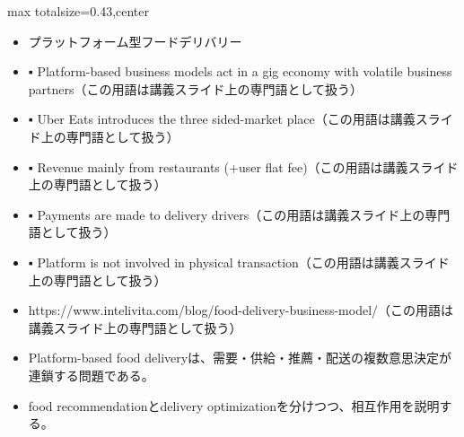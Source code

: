 \clearpage
{}
\begin{minipage}[t]{0.405\textwidth}
\begin{adjustbox}{max totalsize={\textwidth}{0.43\textheight},center}
\begin{minipage}{\textwidth}\scriptsize
{}\begin{itemize}
\item プラットフォーム型フードデリバリー
\item ▪ Platform-based business models act in a gig economy with volatile business partners（この用語は講義スライド上の専門語として扱う）
\item ▪ Uber Eats introduces the three sided-market place（この用語は講義スライド上の専門語として扱う）
\item ▪ Revenue mainly from restaurants (+user flat fee)（この用語は講義スライド上の専門語として扱う）
\item ▪ Payments are made to delivery drivers（この用語は講義スライド上の専門語として扱う）
\item ▪ Platform is not involved in physical transaction（この用語は講義スライド上の専門語として扱う）
\item https://www.intelivita.com/blog/food-delivery-business-model/（この用語は講義スライド上の専門語として扱う）
\end{itemize}\begin{itemize}
\item Platform-based food deliveryは、需要・供給・推薦・配送の複数意思決定が連鎖する問題である。
\item food recommendationとdelivery optimizationを分けつつ、相互作用を説明する。
\end{itemize}
\end{minipage}
\end{adjustbox}
\end{minipage}\hfill
